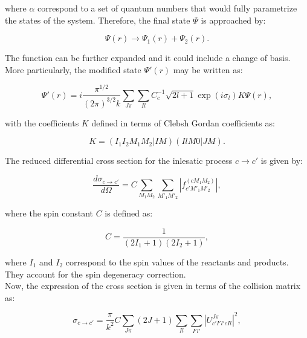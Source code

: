 \documentclass[openany]{book}
\begin{document}
where $\alpha$ correspond to a set of quantum numbers that would fully parametrize the states of the system. Therefore, the final state $\Psi$ is approached by: 

\begin{equation}\label{rmatrix_channels_state_final}
	\Psi(r) \rightarrow \Psi_1(r) + \Psi_2(r).
\end{equation}

The function can be further expanded and it could include a change of basis. More particularly, the modified state $	\Psi'(r)$ may be written as:

\begin{equation}\label{rmatrix_channels_state_final_change}
	\Psi'(r) = i \frac{\pi^{1/2}}{(2\pi)^{3/2} k} \sum_{J\pi} \sum_{Il} C^{-1}_c \sqrt{2l + 1} \exp (i\sigma_l) K \Psi(r),
\end{equation}

with the coefficients $K$ defined in terms of Clebsh Gordan coefficients as: 

\begin{equation}\label{rmatrix_channels_state_final_clebshGordan}
	K = (I_1 I_2 M_1 M_2 | IM)(IlM0 | JM).
\end{equation}


The reduced differential cross section for the inlesatic process $c\rightarrow c'$ is given by:

\begin{equation}\label{rmatrix_difcrossSection_ccprime}
	\frac{d\sigma_{c\rightarrow c'}}{d\Omega} = C \sum_{M_1M_2} \sum_{M'_1M'_2} |f^{(c M_1 M_2)}_{c' M'_1 M'_2}|,
\end{equation}

where the spin constant $C$ is defined as:

\begin{equation}\label{rmatrix_difcrossSection_spinConstant}
	C = \frac{1}{(2I_1 + 1)(2I_2 + 1)},
\end{equation}

where $I_1$ and $I_2$ correspond to the spin values of the reactants and products. They account for the spin degeneracy correction. \\

Now, the expression of the cross section is given in terms of the collision matrix as:

\begin{equation}\label{rmatrix_crossSection_ccprime}
	\sigma_{c\rightarrow c'} = \frac{\pi}{k^2} C \sum_{J\pi} {(2J +1) \sum_{Il} \sum_{I'l'} |U^{J\pi}_{c'I'l'cIl}|^2},
\end{equation}
\end{document}

